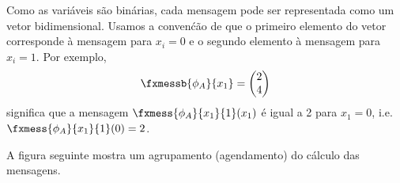 \begin{exenumerate}
    \begin{solution}
        Como as vari\'aveis s\~ao bin\'arias, cada mensagem pode ser representada como um vetor bidimensional. Usamos a conven\'c\~ao de que o primeiro elemento do vetor corresponde \`a mensagem para $x_i = 0$ e o segundo elemento \`a mensagem para $x_i = 1$. Por exemplo,
        \begin{equation}
            \fxmessb{\phi_A}{x_1}= \begin{pmatrix}
                2 \\
                4 \\
            \end{pmatrix}
        \end{equation}
        significa que a mensagem $\fxmess{\phi_A}{x_1}{1}(x_1)$ \'e igual a 2 para $x_1=0$, i.e.\ $\fxmess{\phi_A}{x_1}{1}(0)=2$.
        
        A figura seguinte mostra um agrupamento (agendamento) do c\'alculo das mensagens. 
        \begin{figure}[h]
            \begin{center}
\end{center}
\end{figure}
\end{solution}
\end{exenumerate}
